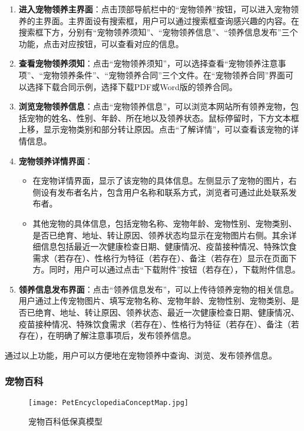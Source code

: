 \begin{enumerate}
	\item \textbf{进入宠物领养主界面}：点击顶部导航栏中的“宠物领养”按钮，可以进入宠物领养的主界面。主界面设有搜索框，用户可以通过搜索框查询感兴趣的内容。在搜索框下方，分别有“宠物领养须知”、“宠物领养信息”、“领养信息发布”三个功能，点击对应按钮，可以查看对应的信息。
	\item \textbf{查看宠物领养须知}：点击“宠物领养须知”，可以选择查看“宠物领养注意事项”、“宠物领养条件”、“宠物领养合同”三个文件。在“宠物领养合同”界面可以选择下载合同示例，选择下载PDF或Word版的领养合同。
	\item \textbf{浏览宠物领养信息}：点击“宠物领养信息”，可以浏览本网站所有领养宠物，包括宠物的姓名、性别、年龄、所在地以及领养状态。鼠标停留时，下方文本框上移，显示宠物类别和部分转让原因。点击“了解详情”，可以查看该宠物的详情信息。
	\item \textbf{宠物领养详情界面}：
	\begin{itemize}
		\item 在宠物详情界面，显示了该宠物的具体信息。左侧显示了宠物的图片，右侧设有发布者名片，包含用户名称和联系方式，浏览者可通过此处联系发布者。
		\item 其他宠物的具体信息，包括宠物名称、宠物年龄、宠物性别、宠物类别、是否已绝育、地址、转让原因、领养状态均显示在宠物图片右侧。其余详细信息包括最近一次健康检查日期、健康情况、疫苗接种情况、特殊饮食需求（若存在）、性格行为特征（若存在）、备注（若存在）显示在页面下方。同时，用户可以通过点击“下载附件”按钮（若存在），下载附件信息。
	\end{itemize}
	\item \textbf{领养信息发布界面}：点击“领养信息发布”，可以上传待领养宠物的相关信息。用户通过上传宠物图片、填写宠物名称、宠物年龄、宠物性别、宠物类别、是否已绝育、地址、转让原因、领养状态、最近一次健康检查日期、健康情况、疫苗接种情况、特殊饮食需求（若存在）、性格行为特征（若存在）、备注（若存在），在明确了解注意事项后，发布领养信息。
\end{enumerate}

通过以上功能，用户可以方便地在宠物领养中查询、浏览、发布领养信息。

\subsubsection{宠物百科}

\begin{figure}[H]
	\centering
	\texttt{[image: PetEncyclopediaConceptMap.jpg]}
	\caption{宠物百科低保真模型}
	\label{PetEncyclopediaConceptMap}
\end{figure}

